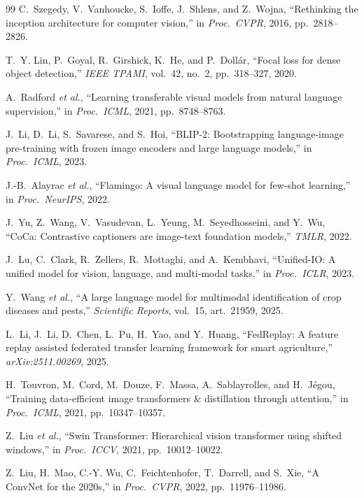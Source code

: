 \documentclass[conference]{IEEEtran}
\begin{document}
\begin{thebibliography}{99}
C.~Szegedy, V.~Vanhoucke, S.~Ioffe, J.~Shlens, and Z.~Wojna, ``Rethinking the
inception architecture for computer vision,'' in \emph{Proc.\ CVPR}, 2016,
pp.~2818--2826.

T.~Y. Lin, P.~Goyal, R.~Girshick, K.~He, and P.~Doll\'{a}r, ``Focal loss for dense
object detection,'' \emph{IEEE TPAMI}, vol.~42, no.~2, pp.~318--327, 2020.

A.~Radford \emph{et al.}, ``Learning transferable visual models from natural
language supervision,'' in \emph{Proc.\ ICML}, 2021, pp.~8748--8763.

J.~Li, D.~Li, S.~Savarese, and S.~Hoi, ``BLIP-2: Bootstrapping language-image
pre-training with frozen image encoders and large language models,'' in
\emph{Proc.\ ICML}, 2023.

J.-B.~Alayrac \emph{et al.}, ``Flamingo: A visual language model for few-shot
learning,'' in \emph{Proc.\ NeurIPS}, 2022.

J.~Yu, Z.~Wang, V.~Vasudevan, L.~Yeung, M.~Seyedhosseini, and Y.~Wu, ``CoCa:
Contrastive captioners are image-text foundation models,'' \emph{TMLR}, 2022.

J.~Lu, C.~Clark, R.~Zellers, R.~Mottaghi, and A.~Kembhavi, ``Unified-IO: A unified
model for vision, language, and multi-modal tasks,'' in \emph{Proc.\ ICLR}, 2023.

Y.~Wang \emph{et al.}, ``A large language model for multimodal identification of
crop diseases and pests,'' \emph{Scientific Reports}, vol.~15, art.~21959, 2025.

L.~Li, J.~Li, D.~Chen, L.~Pu, H.~Yao, and Y.~Huang, ``{FedReplay}: A feature
replay assisted federated transfer learning framework for smart agriculture,''
\emph{arXiv:2511.00269}, 2025.

H.~Touvron, M.~Cord, M.~Douze, F.~Massa, A.~Sablayrolles, and H.~J\'{e}gou,
``Training data-efficient image transformers \& distillation through attention,''
in \emph{Proc.\ ICML}, 2021, pp.~10347--10357.

Z.~Liu \emph{et al.}, ``Swin Transformer: Hierarchical vision transformer using
shifted windows,'' in \emph{Proc.\ ICCV}, 2021, pp.~10012--10022.

Z.~Liu, H.~Mao, C.-Y. Wu, C.~Feichtenhofer, T.~Darrell, and S.~Xie, ``A ConvNet for
the 2020s,'' in \emph{Proc.\ CVPR}, 2022, pp.~11976--11986.


\end{thebibliography}
\end{document}
